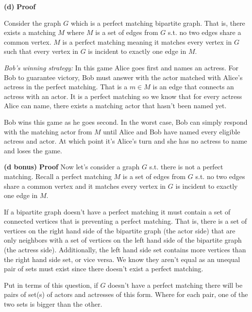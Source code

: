\documentclass[11pt]{article}
\renewcommand\part[1]{\vspace{.10in}\textbf{(#1)}}
\begin{document}

\part{d} \textbf{Proof} 

Consider the graph $G$ which is a perfect matching bipartite graph. That is, there exists a matching $M$ where $M$ is a set of edges from $G$ s.t. no two edges share a common vertex. $M$ is a perfect matching meaning it matches every vertex in $G$ such that every vertex in $G$ is incident to exactly one edge in $M$.

\textit{Bob's winning strategy:} In this game Alice goes first and names an actress. For Bob to guarantee victory, Bob must answer with the actor matched with Alice's actress in the perfect matching. That is a $m \in M$ is an edge that connects an actress with an actor. It is a perfect matching so we know that for every actress Alice can name, there exists a matching actor that hasn't been named yet.

Bob wins this game as he goes second. In the worst case, Bob can simply respond with the matching actor from $M$ until Alice and Bob have named every eligible actress and actor. At which point it's Alice's turn and she has no actress to name and loses the game.

\part{d bonus} \textbf{Proof}
Now let's consider a graph $G$ s.t. there is not a perfect matching. Recall a perfect matching $M$ is a set of edges from $G$ s.t. no two edges share a common vertex and it matches every vertex in $G$ is incident to exactly one edge in $M$.

 If a bipartite graph doesn't have a perfect matching it must contain a set of connected vertices that is preventing a perfect matching. That is, there is a set of vertices on the right hand side of the bipartite graph (the actor side) that are only neighbors with a set of vertices on the left hand side of the bipartite graph (the actress side). Additionally, the left hand side set contains more vertices than the right hand side set, or vice versa. We know they aren't equal as an unequal pair of sets must exist since there doesn't exist a perfect matching.
 
 	Put in terms of this question, if $G$ doesn't have a perfect matching there will be pairs of set(s) of actors and actresses of this form. Where for each pair, one of the two sets is bigger than the other.
\end{document}
